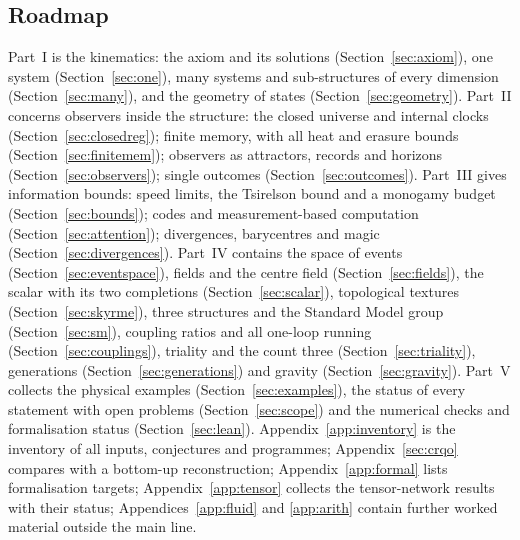 \documentclass[aps,pra,onecolumn,superscriptaddress,nofootinbib,10pt]{revtex4-2}
\theoremstyle{definition}
\theoremstyle{remark}
\begin{document}
\subsection{Roadmap}
Part~I is the kinematics: the axiom and its solutions (Section~\ref{sec:axiom}), one system (Section~\ref{sec:one}), many
systems and sub-structures of every dimension (Section~\ref{sec:many}), and the geometry of states
(Section~\ref{sec:geometry}).  Part~II concerns observers inside the structure: the closed universe and internal clocks
(Section~\ref{sec:closedreg}); finite memory, with all heat and erasure bounds (Section~\ref{sec:finitemem}); observers as
attractors, records and horizons (Section~\ref{sec:observers}); single outcomes (Section~\ref{sec:outcomes}).  Part~III gives
information bounds: speed limits, the Tsirelson bound and a monogamy budget (Section~\ref{sec:bounds}); codes and
measurement-based computation (Section~\ref{sec:attention}); divergences, barycentres and magic (Section~\ref{sec:divergences}).
Part~IV contains the space of events (Section~\ref{sec:eventspace}), fields and the centre field (Section~\ref{sec:fields}), the scalar
with its two completions (Section~\ref{sec:scalar}), topological textures (Section~\ref{sec:skyrme}), three structures and the
Standard Model group (Section~\ref{sec:sm}), coupling ratios and all one-loop running (Section~\ref{sec:couplings}), triality
and the count three (Section~\ref{sec:triality}), generations (Section~\ref{sec:generations}) and gravity
(Section~\ref{sec:gravity}).  Part~V collects the physical examples (Section~\ref{sec:examples}), the status of every statement
with open problems (Section~\ref{sec:scope}) and the numerical checks and formalisation status (Section~\ref{sec:lean}).
Appendix~\ref{app:inventory} is the inventory of all inputs, conjectures and programmes; Appendix~\ref{sec:crqo} compares
with a bottom-up reconstruction; Appendix~\ref{app:formal} lists formalisation targets; Appendix~\ref{app:tensor} collects
the tensor-network results with their status; Appendices~\ref{app:fluid} and \ref{app:arith} contain further worked
material outside the main line.
\end{document}
